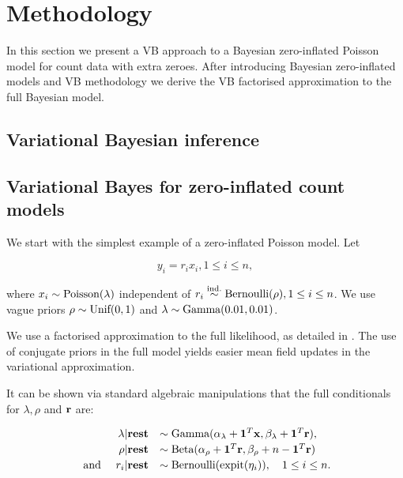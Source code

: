 \documentclass{article}[12pt]
\begin{document}
\section{Methodology}\label{sec:methodology}

In this section we present a VB approach to a Bayesian zero-inflated Poisson model
for count data with extra zeroes. After introducing Bayesian zero-inflated models
and VB methodology we derive the VB factorised approximation to the full Bayesian
model.

 

\subsection{Variational Bayesian inference}

\subsection{Variational Bayes for zero-inflated count models}

\noindent We start with the simplest example of a zero-inflated Poisson model. Let

$$
y_i = r_i x_i, 1 \leq i \leq n,
$$

\noindent where $x_i \sim \text{Poisson} (\lambda)$ independent of $r_i \stackrel{\text{ind.}}{\sim} \text{Bernoulli} (\rho), 1 \leq i \leq n$. We use vague priors
$\rho \sim \text{Unif} (0, 1)$ and $\lambda \sim \text{Gamma} (0.01, 0.01)$. 

 

  We use a factorised approximation to the full likelihood, as detailed in \citep{ormerod10}.
The use of conjugate priors in the full model yields easier mean field updates in the
variational approximation.

  It can be shown via standard algebraic manipulations that the
full conditionals for $\lambda, \rho$ and ${\bf r}$ are:

$$
\begin{array}{rl}
\lambda | \textbf{rest} &\sim \text{Gamma} (\alpha_\lambda + {\bf 1}^T{\bf x}, \beta_\lambda + {\bf 1}^T{\bf r}), \\ [0.5ex]
\rho | \textbf{rest} &\sim \text{Beta} (\alpha_\rho + {\bf 1}^T {\bf r}, \beta_\rho + n - {\bf 1}^T{\bf r}) \\ [0.5ex]
\mbox{ and } \quad r_i | \textbf{rest} &\sim \text{Bernoulli} (\text{expit}(\eta_i)), \quad 1 \leq i \leq n.
\end{array}
$$

\end{document}
